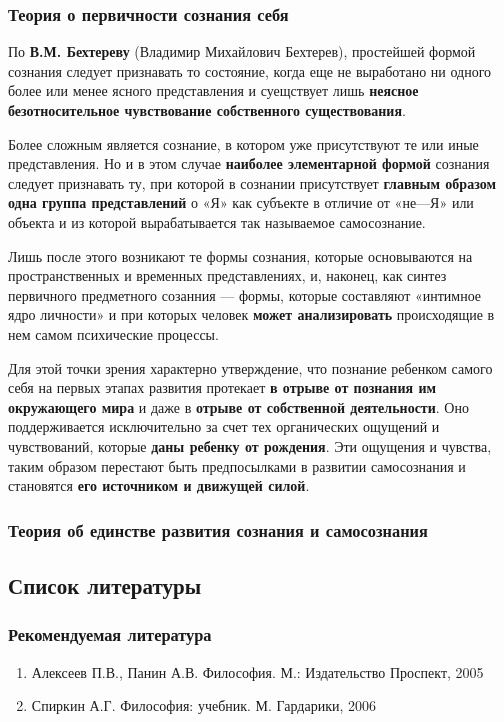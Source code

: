 \documentclass{article}
\begin{document}
\subsubsection{Теория о первичности сознания себя}

\begin{flushleft}

По \textbf{В.М. Бехтереву} (Владимир Михайлович Бехтерев), простейшей формой сознания следует признавать то состояние, когда еще не выработано ни одного более или менее ясного представления и суещствует лишь \textbf{неясное безотносительное чувствование собственного существования}.

Более сложным является сознание, в котором уже присутствуют те или иные представления. Но и в этом случае \textbf{наиболее элементарной формой} сознания следует признавать ту, при которой в сознании присутствует \textbf{главным образом одна группа представлений} о «Я» как субъекте в отличие от «не—Я» или объекта и из которой вырабатывается так называемое самосознание.

Лишь после этого возникают те формы сознания, которые основываются на пространственных и временных представлениях, и, наконец, как синтез первичного предметного созанния — формы, которые составляют «интимное ядро личности» и при которых человек \textbf{может анализировать} происходящие в нем самом психические процессы.

Для этой точки зрения характерно утверждение, что познание ребенком самого себя на первых этапах развития протекает \textbf{в отрыве от познания им окружающего мира} и даже в \textbf{отрыве от собственной деятельности}. Оно поддерживается исключительно за счет тех органических ощущений и чувствований, которые \textbf{даны ребенку от рождения}. Эти ощущения и чувства, таким образом перестают быть предпосылками в развитии самосознания и становятся \textbf{его источником и движущей силой}.

\end{flushleft}

\subsubsection{Теория об единстве развития сознания и самосознания}

\pagebreak
\subsection{Список литературы}

\subsubsection{Рекомендуемая литература}

\begin{enumerate}
    \item Алексеев П.В., Панин А.В. Философия. М.: Издательство Проспект, 2005
    \item Спиркин А.Г. Философия: учебник. М. Гардарики, 2006
\end{enumerate}
\end{document}
